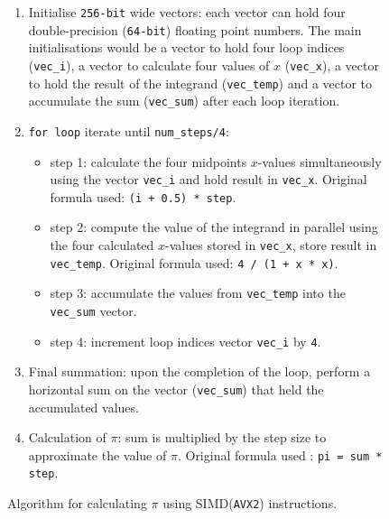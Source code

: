 \begin{figure}[htbp]
\centering
\begin{enumerate}
	\item Initialise \texttt{256-bit} wide vectors: each vector can hold four double-precision (\texttt{64-bit}) floating point numbers. The main initialisations would be a vector to hold four loop indices (\texttt{vec\_i}), a vector to calculate four values of $x$ (\texttt{vec\_x}), a vector to hold the result of the integrand (\texttt{vec\_temp}) and a vector to accumulate the sum (\texttt{vec\_sum}) after each loop iteration.
	\item \texttt{for loop} iterate until \texttt{num\_steps/4}:
	\begin{itemize}
		\item step 1: calculate the four midpoints $x$-values simultaneously using the vector \texttt{vec\_i} and hold result in \texttt{vec\_x}. Original formula used: \texttt{(i + 0.5) * step}.
		\item step 2: compute the value of the integrand in parallel using the four calculated $x$-values stored in \texttt{vec\_x}, store result in \texttt{vec\_temp}. Original formula used: \texttt{4 / (1 + x * x)}.
		\item step 3: accumulate the values from \texttt{vec\_temp} into the \texttt{vec\_sum} vector.
		\item step 4: increment loop indices vector \texttt{vec\_i} by \texttt{4}. 
	\end{itemize}
	\item Final summation: upon the completion of the loop, perform a horizontal sum on the vector (\texttt{vec\_sum}) that held the accumulated values.
	\item Calculation of $\pi$: sum is multiplied by the step size to approximate the value of $\pi$. Original formula used : \texttt{pi = sum * step}.
\end{enumerate}
\caption{Algorithm for calculating $\pi$ using SIMD(\texttt{AVX2}) instructions.}
\label{fig:_simd_algorithm}
\end{figure}


